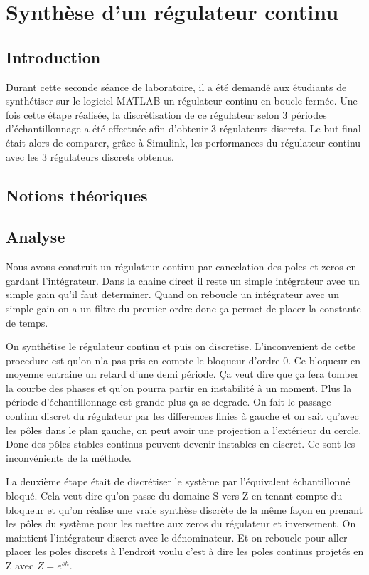 \chapter{Synthèse d'un régulateur continu}

\section{Introduction}
Durant cette seconde séance de laboratoire, il a été demandé aux étudiants de synthétiser sur le logiciel MATLAB un régulateur continu en boucle fermée.
Une fois cette étape réalisée, la discrétisation de ce régulateur selon 3 périodes d'échantillonnage a été effectuée afin d'obtenir 3 régulateurs discrets.
Le but final était alors de comparer, grâce à Simulink, les performances du régulateur continu avec les 3 régulateurs discrets obtenus. 

\section{Notions théoriques}


\section{Analyse}
Nous avons construit un régulateur continu par cancelation des poles et zeros en gardant l'intégrateur.
Dans la chaine direct il reste un simple intégrateur avec un simple gain qu'il faut determiner.
Quand on reboucle un intégrateur avec un simple gain on a un filtre du premier ordre donc ça permet de placer la constante de temps.

On synthétise le régulateur continu et puis on discretise.
L'inconvenient de cette procedure est qu'on n'a pas pris en compte le bloqueur d'ordre 0.
Ce bloqueur en moyenne entraine un retard d'une demi période.
Ça veut dire que ça fera tomber la courbe des phases et qu'on pourra partir en instabilité à un moment.
Plus la période d'échantillonnage est grande plus ça se degrade.
On fait le passage continu discret du régulateur par les differences finies à gauche et on sait qu'avec les pôles dans le plan gauche, on peut avoir une projection a l'extérieur du cercle.
Donc des pôles stables continus peuvent devenir instables en discret. Ce sont les inconvénients de la méthode.

La deuxième étape était de discrétiser le système par l'équivalent échantillonné bloqué.
Cela veut dire qu'on passe du domaine S vers Z en tenant compte du bloqueur et qu'on réalise une vraie synthèse discrète de la même façon en prenant les pôles du système pour les mettre aux zeros du régulateur et inversement.
On maintient l'intégrateur discret avec le dénominateur. 
Et on reboucle pour aller placer les poles discrets à l'endroit voulu c'est à dire les poles continus projetés en Z avec $Z=e^{sh}$.


